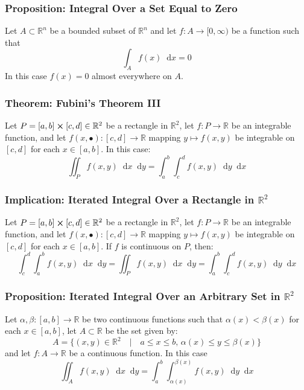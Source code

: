 \documentclass[11pt, a4paper]{article}
\newcommand{\diff}{\mathop{}\!\mathrm{d}} %
\begin{document}
\subsubsection{Proposition: Integral Over a Set Equal to Zero}
Let $ A  \subset \mathbb{R}^n $ be a bounded subset of $ \mathbb{R}^n $ and let $ f : A \rightarrow [0, \infty)$ be a function such that
\begin{equation*}
	\int_A f(x) \diff x = 0
\end{equation*}
In this case $ f(x) = 0$ almost everywhere on $ A $.

\subsubsection{Theorem: Fubini's Theorem III}
Let $ P = [a, b] \cross [c, d] \in \mathbb{R}^2 $ be a rectangle in $ \mathbb{R}^2 $, let $ f : P \rightarrow \mathbb{R} $ be an integrable function, and let $ f(x, \bullet) : [c, d] \rightarrow \mathbb{R} $ mapping $ y \mapsto f(x, y)$ be integrable on $ [c, d] $ for each $ x \in [a, b] $. In this case:
\begin{equation*}
	\iint_P f(x, y)\diff x \diff y = \int_{a}^{b} \int_{c}^{d} f (x, y) \diff y \diff x
\end{equation*}


\subsubsection{Implication: Iterated Integral Over a Rectangle in $ \mathbb{R}^2 $}
Let $ P = [a, b] \cross [c, d] \in \mathbb{R}^2 $ be a rectangle in $ \mathbb{R}^2 $, let $ f : P \rightarrow \mathbb{R} $ be an integrable function, and let $ f(x, \bullet) : [c, d] \rightarrow \mathbb{R} $ mapping $ y \mapsto f(x, y)$ be integrable on $ [c, d] $ for each $ x \in [a, b] $. If $ f $ is continuous on $ P $, then: 
\begin{equation*}
 \int_{c}^{d} \int_{a}^{b} f (x, y) \diff x \diff y = \iint_P f(x, y)\diff x \diff y = \int_{a}^{b} \int_{c}^{d} f (x, y) \diff y \diff x
\end{equation*}

\subsubsection{Proposition: Iterated Integral Over an Arbitrary Set in $ \mathbb{R}^2 $}
Let $\alpha, \beta: [a, b] \rightarrow \mathbb{R}$ be two continuous functions such that $ \alpha(x) < \beta(x)  $ for each $ x \in [a, b] $, let $ A \subset \mathbb{R} $ be the set given by:
\begin{equation*}
	A = \{(x, y) \in \mathbb{R}^2 \quad | \quad a \leq x \leq b, \, \alpha(x) \leq y \leq \beta(x)  \}
\end{equation*}
and let $ f: A \rightarrow \mathbb{R} $ be a continuous function. In this case
\begin{equation*}
	\iint_A f(x, y)\diff x \diff y = \int_{a}^{b} \int_{\alpha(x)}^{\beta(x)}f(x, y)\diff y \diff x
\end{equation*}
\end{document}
